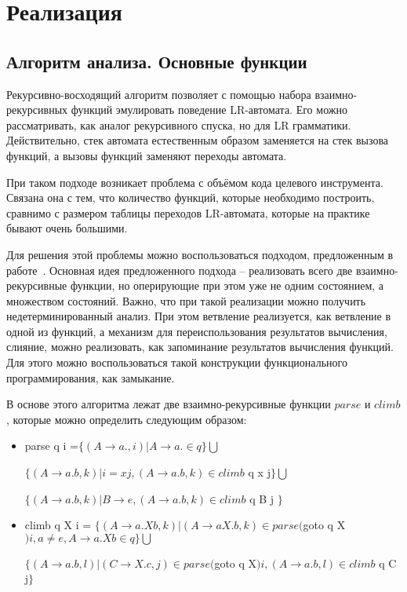 \section{Реализация}
 



\subsection{Алгоритм анализа. Основные функции}

Рекурсивно-восходящий алгоритм позволяет с помощью набора взаимно-рекурсивных функций эмулировать поведение LR-автомата. Его можно рассматривать, как аналог рекурсивного спуска, но для LR грамматики. Действительно, стек автомата естественным образом заменяется на стек вызова функций, а вызовы функций заменяют переходы автомата.

При таком подходе возникает проблема с объёмом кода целевого инструмента. Связана она с тем, что количество функций, которые необходимо построить, сравнимо с размером таблицы переходов LR-автомата, которые на практике бывают очень большими.

Для решения этой проблемы можно воспользоваться подходом, предложенным в работе~\cite{RecursiveAscentParsing}. Основная идея предложенного подхода -- реализовать всего две взаимно-рекурсивные функции, но оперирующие при этом уже не одним состоянием, а множеством состояний. Важно, что при такой реализации можно получить недетерминированный анализ. При этом ветвление реализуется, как ветвление в одной из функций, а механизм для переиспользования результатов вычисления, слияние, можно реализовать, как запоминание результатов вычисления функций. Для этого можно воспользоваться такой конструкции функционального программирования, как замыкание. 

В основе этого алгоритма лежат две взаимно-рекурсивные функции $parse$ и $climb$, которые можно определить следующим образом:
\begin{itemize}
	\item parse  q i =$\{(A\stackrel{}{\rightarrow}a. , i) | A\stackrel{}{\rightarrow} a. \in q\}\bigcup$
  
  \hspace{1,9cm}       $\{(A\stackrel{}{\rightarrow}a.b , k) | i = xj ,(A\stackrel{}{\rightarrow}a.b, k) \in climb$ q x j$  \}
  \bigcup$
  
  \hspace{1,9cm}       $\{(A\stackrel{}{\rightarrow}a.b , k) | B\stackrel{}{\rightarrow}e , (A\stackrel{}{\rightarrow}a.b, k) \in climb$ q B j $\}$
  \item climb q X  i = $\{(A\stackrel{}{\rightarrow}a.Xb , k) | (A\stackrel{}{\rightarrow}aX.b, k)\in parse($goto q X$) i , a\neq e, A\stackrel{}{\rightarrow}a.Xb \in q\}\bigcup$
  
  \hspace{2,5cm}          $\{(A\stackrel{}{\rightarrow}a.b , l) | (C\stackrel{}{\rightarrow}X.c,j)\in parse($goto q X$) i, (A\stackrel{}{\rightarrow}a.b ,l)\in climb$ q C j$\} $
\end{itemize}

